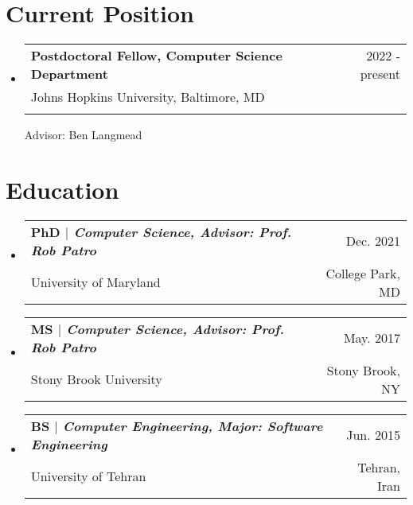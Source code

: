 \documentclass[A4,11pt]{article}
\makeatletter
\newcommand{\CVSubheading}[4]{
  \vspace{-2pt}\item
    \begin{tabular*}{0.97\textwidth}[t]{l@{\extracolsep{\fill}}r}
      \textbf{#1} & #2 \\
      \small#3 & \small #4 \\
    \end{tabular*}\vspace{-7pt}
}
\newcommand{\CVSubHeadingListStart}{\begin{itemize}[leftmargin=0.5cm, label={}]}
\newcommand{\CVSubHeadingListEnd}{\end{itemize}}
\makeatother
\begin{document}
\begin{comment}
This CV was written for specifically for positions I was applying for in
academia, and then modified to be a template.

A standard CV is about two pages long where as a resume in the US is one page.
sections can be added and removed here with this in mind. In my experience, 
education, and applicable work experience and skills are the most import things
to include on a resume. For a CV the Europass CV suggests the categories: Work
Experience, Education and Training, Language Skills, Digital Skills,
Communication and Interpersonal Skills, Conferences and Seminars, Creative Works
Driver's License, Hobbies and Interests, Honors and Awards, Management and
Leadership Skills, Networks and Memberships, Organizational Skills, Projects,
Publications, Recommendations, Social and Political Activities, Volunteering.

Your goal is to convey a who, what , when, where, why for every item you share. 
The who is obviously you, but I believe the rest should be done in that order.
For example below. An employer cares most about the degree held and typically 
less about the institution or where it is located (This is still good 
information though). Whatever order you choose be consistent throughout.
\end{comment}

\section{Current Position}
  \CVSubHeadingListStart
    \CVSubheading{Postdoctoral Fellow, Computer Science Department}{2022 - present}
      {Johns Hopkins University, Baltimore, MD}\\
      {Advisor: Ben Langmead}{ }
  \CVSubHeadingListEnd


\section{Education}
  \CVSubHeadingListStart
    \CVSubheading
      {{PhD $|$ \emph{\small{Computer Science, Advisor: Prof. Rob Patro}}}}{Dec. 2021}
      {University of Maryland}{College Park, MD}
    \CVSubheading
      {{MS $|$ \emph{\small{Computer Science, Advisor: Prof. Rob Patro}}}}{May. 2017}
      {Stony Brook University}{Stony Brook, NY}
    \CVSubheading
      {{BS $|$ \emph{\small{Computer Engineering, Major: Software Engineering}}}}{Jun. 2015}
      {University of Tehran}{Tehran, Iran}
  \CVSubHeadingListEnd
\begin{comment}
try to briefly explain what you did and why it is relevant to the position you
are seeking
\end{comment}
\end{document}
